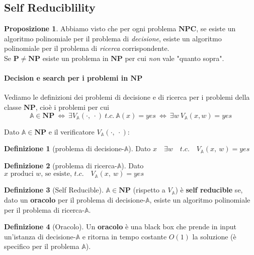 \documentclass[a4paper]{article}
\theoremstyle{definition}
\newtheorem{definit}{Definizione}[subsection]
\newtheorem{prop}{Proposizione}[subsection]
\newcommand{\p}{\mathbf{P}}
\newcommand{\np}{\mathbf{NP}}
\newcommand{\npc}{\mathbf{NPC}}
\newcommand{\prob}[1]{\mathbb{#1}}
\begin{document}
	\subsection{Self Reduciblility}
		\begin{prop}
			Abbiamo visto che per ogni problema $ \npc $, se esiste un algoritmo polinomiale per il problema di \textit{decisione}, esiste un algoritmo polinomiale per il problema di \textit{ricerca} corrispondente.\\
			Se $ \p \neq \np $ esiste un problema in $ \np $ per cui \textit{non} vale "quanto sopra".
		\end{prop}
		
		\paragraph{Decision e search per i problemi in $ \np $} Vediamo le definizioni dei problemi di decisione e di ricerca per i problemi della classe $ \np $, cioè i problemi per cui
		\[
			\prob{A}\in \np \ \Leftrightarrow\ \exists V_{\prob{A}}(\cdot,\ \cdot)\ t.c.\ \prob{A}(x) = yes\ \Leftrightarrow\ \exists w\ V_{\prob{A}}(x, w) = yes
		\]
		
		Dato $ \prob{A} \in \np $ e il verificatore $ V_{\prob{A}}(\cdot,\ \cdot) $:
		\begin{definit}[problema di decisione-$\prob{A} $]
			Dato $ x\quad \exists w\quad t.c.\quad V_{\prob{A}}(x,\ w) = yes $
		\end{definit}
		\begin{definit}[problema di ricerca-$\prob{A} $]
			Dato $ x \text{ produci } w \text{, se esiste, } t.c. \quad V_{\prob{A}}(x,\ w) = yes $
		\end{definit}
		
		\bigskip
		
		\begin{definit}[Self Reducible]
			$ \prob{A}\in \np $ (rispetto a $ V_{\prob{A}} $) è \textbf{self reducible} se, dato un \textbf{oracolo} per il problema di decisione-$\prob{A} $, esiste un algoritmo polinomiale per il problema di ricerca-$\prob{A} $.
		\end{definit}
		
		\begin{definit}[Oracolo]
			Un \textbf{oracolo} è una black box che prende in input un'istanza di decisione-$\prob{A} $ e ritorna in tempo costante $ O(1) $ la soluzione (è specifico per il problema $ \prob{A} $).
		\end{definit}
		
\end{document}
